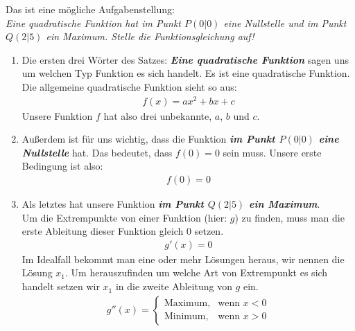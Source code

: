 \begin{flushleft}
    Das ist eine mögliche Aufgabenstellung: \\
    \textit{Eine quadratische Funktion hat im Punkt $P(0|0)$ eine Nullstelle und im Punkt $Q(2|5)$ ein Maximum. Stelle die Funktionsgleichung auf!} \\
    \begin{enumerate}
        \item {
                Die ersten drei Wörter des Satzes: \textbf{\textit{Eine quadratische Funktion}} sagen uns um welchen Typ Funktion es sich handelt.
                Es ist eine quadratische Funktion. Die allgemeine quadratische Funktion sieht so aus:
                \begin{align}
                    f(x)=ax^2+bx+c
                \end{align}
                Unsere Funktion $f$ hat also drei unbekannte, $a$, $b$ und $c$.
            }
        \item {
                Außerdem ist für uns wichtig, dass die Funktion \textbf{\textit{im Punkt $P(0|0)$ eine Nullstelle}} hat.
                Das bedeutet, dass $f(0)=0$ sein muss.
                Unsere erste Bedingung ist also:
                \begin{align}
                    f(0)=0
                \end{align}
            }
        \item {
                Als letztes hat unsere Funktion \textbf{\textit{im Punkt $Q(2|5)$ ein Maximum}}. \\
                Um die Extrempunkte von einer Funktion (hier: $g$) zu finden, muss man die erste Ableitung dieser Funktion gleich $0$ setzen.
                \begin{align}
                    g'(x)=0
                \end{align}
                Im Idealfall bekommt man eine oder mehr Lösungen heraus, wir nennen die Lösung $x_1$.
                Um herauszufinden um welche Art von Extrempunkt es sich handelt setzen wir $x_1$ in die zweite Ableitung von $g$ ein.
                \begin{align}            
                    g''(x) =
                    \begin{cases}
                        \text{Maximum}, &\text{wenn } x < 0 \\
                        \text{Minimum}, &\text{wenn } x > 0
                    \end{cases}
                \end{align}
}
\end{enumerate}
\end{flushleft}
